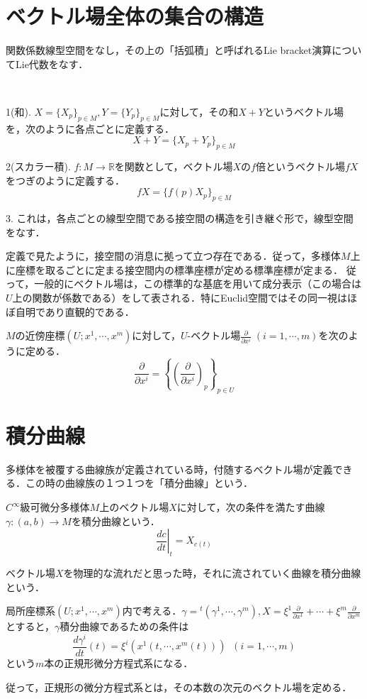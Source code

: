 \documentclass[uplatex, dvipdfmx]{jsreport}
\begin{document}
\section{ベクトル場全体の集合の構造}
関数係数線型空間をなし，その上の「括弧積」と呼ばれるLie bracket演算についてLie代数をなす．

\begin{definition}[ベクトル場の和と関数倍]　

    1(和). $X=\{X_p\}_{p\in M}, Y=\{Y_p\}_{p\in M}$に対して，その和$X+Y$というベクトル場を，次のように各点ごとに定義する．
    \[ X+Y = \{X_p+Y_p\}_{p\in M} \]

    2(スカラー積). $f:M\to\mathbb{R}$を関数として，ベクトル場$X$の$f$倍というベクトル場$fX$をつぎのように定義する．
    \[ fX=\{f(p)X_p\}_{p\in M} \]

    3. これは，各点ごとの線型空間である接空間の構造を引き継ぐ形で，線型空間をなす．
\end{definition}

定義で見たように，接空間の消息に拠って立つ存在である．従って，多様体$M$上に座標を取るごとに定まる接空間内の標準座標が定める標準座標が定まる．
従って，一般的にベクトル場は，この標準的な基底を用いて成分表示（この場合は$U$上の関数が係数である）をして表される．特にEuclid空間ではその同一視はほぼ自明であり直観的である．
\begin{definition}
    $M$の近傍座標$(U;x^1,\cdots,x^m)$に対して，$U$-ベクトル場$\frac{\partial}{\partial x^i}\; (i=1,\cdots,m)$を次のように定める．
    \[ \frac{\partial}{\partial x^i} = \left\{\left(\frac{\partial}{\partial x^i}\right)_p\right\}_{p\in U} \]
\end{definition}

\section{積分曲線}
多様体を被覆する曲線族が定義されている時，付随するベクトル場が定義できる．この時の曲線族の１つ１つを「積分曲線」という．

\begin{definition}
    $C^\infty$級可微分多様体$M$上のベクトル場$X$に対して，次の条件を満たす曲線$\gamma:(a,b)\to M$を積分曲線という．
    \[ \left. \frac{dc}{dt} \right|_{t} = X_{c(t)} \]
\end{definition}
\begin{remark}
    ベクトル場$X$を物理的な流れだと思った時，それに流されていく曲線を積分曲線という．

    局所座標系$(U;x^1,\cdots,x^m)$内で考える．$\gamma={}^t(\gamma^1,\cdots,\gamma^m), X=\xi^1\frac{\partial}{\partial x^1}+\cdots +\xi^m\frac{\partial}{\partial x^m}$とすると，$\gamma$積分曲線であるための条件は
    \[ \frac{d\gamma^i}{dt}(t) = \xi^i(x^1(t,\cdots,x^m(t)))\;\; (i=1,\cdots,m) \]
    という$m$本の正規形微分方程式系になる．

    従って，正規形の微分方程式系とは，その本数の次元のベクトル場を定める．
\end{remark}
\end{document}
